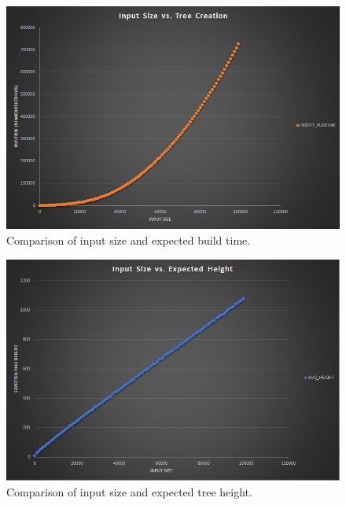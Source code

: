 \documentclass[a4paper,twoside,12pt]{report}
\begin{document}
{}
\tableofcontents
\newpage
{}
{}

\listoffigures

\begin{figure}[h]
	\centering
	\includegraphics[width=1.0\textwidth]{images/size-vs-build-time}
	\caption{Comparison of input size and expected build time.}
	\label{fig:size-vs-runtime}
\end{figure}
\begin{figure}[h]
	\centering
	\includegraphics[width=1.0\textwidth]{images/size-vs-tree-height}
	\caption{Comparison of input size and expected tree height.}
	\label{fig:size-vs-tree-height}
\end{figure}
\end{document}
